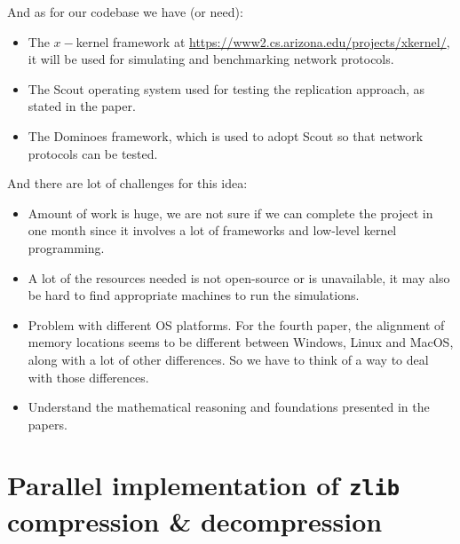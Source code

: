 \documentclass[11pt]{article}
\begin{document}
	And as for our codebase we have (or need):
	\begin{itemize}
		\item The $x-$kernel framework at \url{https://www2.cs.arizona.edu/projects/xkernel/}, it will be used for simulating and benchmarking network protocols.
		\item The Scout operating system used for testing the replication approach, as stated in the paper.
		\item The Dominoes framework, which is used to adopt Scout so that network protocols can be tested.
	\end{itemize}
	And there are lot of challenges for this idea:
	\begin{itemize}
		\item Amount of work is huge, we are not sure if we can complete the project in one month since it involves a lot of frameworks and low-level kernel programming.
		\item A lot of the resources needed is not open-source or is unavailable, it may also be hard to find appropriate machines to run the simulations.
		\item Problem with different OS platforms. For the fourth paper, the alignment of memory locations seems to be different between Windows, Linux and MacOS, along with a lot of other differences. So we have to think of a way to deal with those differences.
		\item Understand the mathematical reasoning and foundations presented in the papers.
	\end{itemize}

	\section{Parallel implementation of \texttt{zlib} compression \& decompression}
	
	
\end{document}
